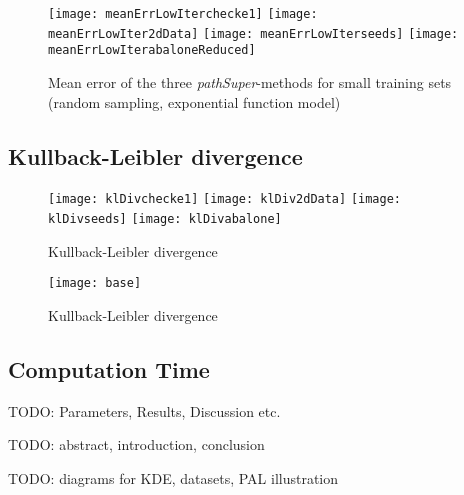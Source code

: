 \begin{figure}[h]
	\centering
	\texttt{[image: meanErrLowIterchecke1]}
	\texttt{[image: meanErrLowIter2dData]}
	\texttt{[image: meanErrLowIterseeds]}
	\texttt{[image: meanErrLowIterabaloneReduced]}
	\caption{Mean error of the three \textit{pathSuper}-methods for small training sets (random sampling, exponential function model)}
	\label{fig:meanErrorLowIter}
\end{figure}

\subsection{Kullback-Leibler divergence}

\begin{figure}[h]
	\centering
	\texttt{[image: klDivchecke1]}
	\texttt{[image: klDiv2dData]}
	\texttt{[image: klDivseeds]}
	\texttt{[image: klDivabalone]}
	\caption{Kullback-Leibler divergence }
	\label{fig:klDiv}
\end{figure}

\begin{figure}[h]
	\centering
	\texttt{[image: base]}
	\caption{Kullback-Leibler divergence}
	\label{fig:timeHist}
\end{figure}

\subsection{Computation Time}

TODO: Parameters, Results, Discussion etc.

TODO: abstract, introduction, conclusion

TODO: diagrams for KDE, datasets, PAL illustration
